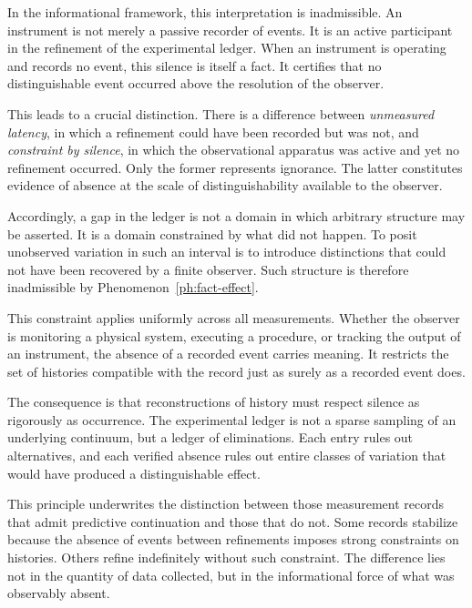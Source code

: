 In the informational framework, this interpretation is inadmissible. An
instrument is not merely a passive recorder of events. It is an active
participant in the refinement of the experimental ledger. When an instrument
is operating and records no event, this silence is itself a fact. It certifies
that no distinguishable event occurred above the resolution of the observer.

This leads to a crucial distinction. There is a difference between
\emph{unmeasured latency}, in which a refinement could have been recorded but
was not, and \emph{constraint by silence}, in which the observational apparatus
was active and yet no refinement occurred. Only the former represents ignorance.
The latter constitutes evidence of absence at the scale of distinguishability
available to the observer.

Accordingly, a gap in the ledger is not a domain in which arbitrary structure
may be asserted. It is a domain constrained by what did not happen. To posit
unobserved variation in such an interval is to introduce distinctions that
could not have been recovered by a finite observer. Such
structure is therefore inadmissible by Phenomenon~\ref{ph:fact-effect}.

This constraint applies uniformly across all measurements. Whether
the observer is monitoring a physical system, executing a procedure, or
tracking the output of an instrument, the absence of a recorded event carries
meaning. It restricts the set of histories compatible with the record just as
surely as a recorded event does.

The consequence is that reconstructions of history must respect
silence as rigorously as occurrence. The experimental ledger is not a sparse
sampling of an underlying continuum, but a ledger of eliminations. Each entry
rules out alternatives, and each verified absence rules out entire classes of
variation that would have produced a distinguishable effect.

This principle underwrites the distinction between those measurement records
that admit predictive continuation and those that do not. Some records
stabilize because the absence of events between refinements imposes strong
constraints on histories. Others refine indefinitely without such
constraint. The difference lies not in the quantity of data collected, but in
the informational force of what was observably absent.

